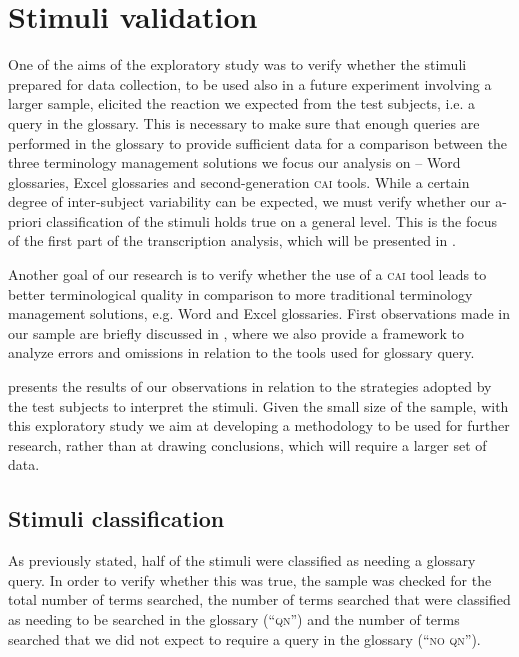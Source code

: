 \documentclass[output=paper]{langsci/langscibook}
\begin{document}
\section{Stimuli validation}\label{sec:prandi:5}
One of the aims of the exploratory study was to verify whether the stimuli prepared for data collection, to be used also in a future experiment involving a larger sample, elicited the reaction we expected from the test subjects, i.e. a query in the glossary. This is necessary to make sure that enough queries are performed in the glossary to provide sufficient data for a comparison between the three terminology management solutions we focus our analysis on – Word glossaries, Excel glossaries and second-generation \textsc{cai} tools. While a certain degree of inter-subject variability can be expected, we must verify whether our a-priori classification of the stimuli holds true on a general level. This is the focus of the first part of the transcription analysis, which will be presented in .

Another goal of our research is to verify whether the use of a \textsc{cai} tool leads to better terminological quality in comparison to more traditional terminology management solutions, e.g. Word and Excel glossaries. First observations made in our sample are briefly discussed in , where we also provide a framework to analyze errors and omissions in relation to the tools used for glossary query.

presents the results of our observations in relation to the strategies adopted by the test subjects to interpret the stimuli. Given the small size of the sample, with this exploratory study we aim at developing a methodology to be used for further research, rather than at drawing conclusions, which will require a larger set of data. 

\subsection{Stimuli classification}\label{sec:prandi:5.1}
As previously stated, half of the stimuli were classified as needing a glossary query. In order to verify whether this was true, the sample was checked for the total number of terms searched, the number of terms searched that were classified as needing to be searched in the glossary (``\textsc{qn}'') and the number of terms searched that we did not expect to require a query in the glossary (``\textsc{no qn}''). 
\end{document}
